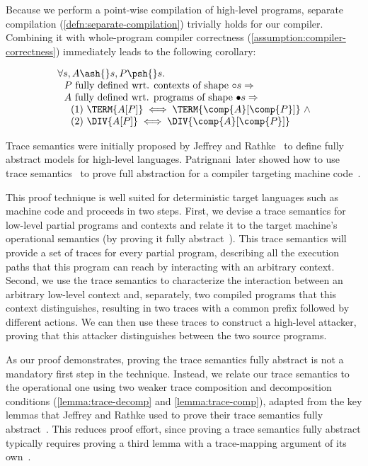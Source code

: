 \documentclass[10pt, conference, compsocconf, letterpaper, times]{IEEEtran}
\begin{document}
Because we perform a point-wise compilation of high-level programs,
separate compilation (\autoref{defn:separate-compilation}) trivially
holds for our compiler.
Combining it with whole-program compiler correctness
(\autoref{assumption:compiler-correctness}) immediately leads to the
following corollary:

\begin{cor}\Coqed
\label{cor:separate-compiler-correctness}
\[
\begin{array}{l}
\forall s, A \ash{}s, P \psh{}s. \\
~~ P\text{ fully defined wrt. contexts of shape }{\circ}{s} \Rightarrow \\
~~ A\text{ fully defined wrt. programs of shape
}{\bullet}{s} \Rightarrow \\
\text{~~~~(1) }\TERM{A[P]} \iff \TERM{\comp{A}[\comp{P}]}~\wedge \\
\text{~~~~(2) }\DIV{A[P]} \iff \DIV{\comp{A}[\comp{P}]}
\end{array}
\]
\end{cor}

\label{sec:proof-outline}

Trace semantics were initially proposed by Jeffrey and
Rathke~\cite{JeffreyR05b,JeffreyR05} to define fully abstract models
for high-level languages.
Patrignani~\ETAL later showed
how to use trace semantics~\cite{PatrignaniC15} to prove full
abstraction for a compiler targeting machine
code~\cite{PatrignaniASJCP15}.

This proof technique is well suited for deterministic target languages
such as machine code and proceeds in two steps.
First, we devise a trace semantics for low-level partial programs and
contexts and relate it to the target machine's operational semantics (\EG by
proving it fully abstract~\cite{PatrignaniC15}).
This trace semantics will provide a set of traces for every partial
program, describing all the execution paths that this program
can reach by interacting with an arbitrary context.
Second, we use the trace semantics to characterize the interaction
between an arbitrary low-level context and, separately, two compiled
programs that this context distinguishes, resulting in two traces with a
common prefix followed by different actions.
We can then use these traces to construct a high-level attacker,
proving that this attacker distinguishes between the two source programs.

As our proof demonstrates, proving the trace semantics fully abstract
is not a mandatory first step in the technique.
Instead, we relate our trace semantics to the operational one
using two weaker trace composition and decomposition conditions
(\autoref{lemma:trace-decomp}
and \autoref{lemma:trace-comp}),
adapted from the key lemmas that Jeffrey and Rathke used to
prove their trace semantics fully
abstract~\cite{JeffreyR05b,JeffreyR05}.
This reduces proof effort, since proving a trace semantics fully
abstract typically requires proving a third lemma with a
trace-mapping argument of its
own~\cite{PatrignaniC15,JeffreyR05b,JeffreyR05}.
\end{document}
